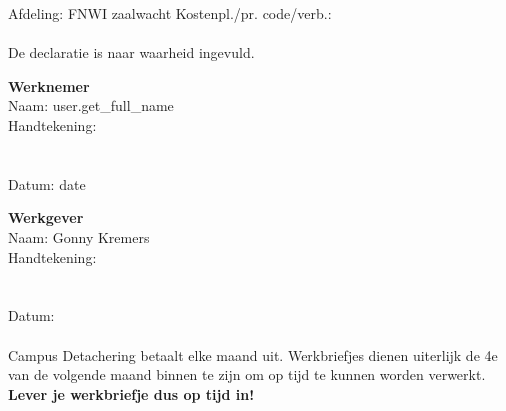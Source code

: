 \documentclass[a4paper,twoside]{article}
\begin{document}
			Afdeling: FNWI zaalwacht Kostenpl./pr. code/verb.:

		\paragraph{}

			De declaratie is naar waarheid ingevuld.

			\begin{multicols}{2}
				\textbf{Werknemer}
				\\
				Naam: {{ user.get_full_name }}
				\\
				Handtekening:
				\\
				\\
				\\
				Datum: {{ date }}

			\columnbreak
				\textbf{Werkgever}
				\\
				Naam: Gonny Kremers
				\\
				Handtekening:
				\\
				\\
				\\
				Datum:

			\end{multicols}

		\paragraph{}

			Campus Detachering betaalt elke maand uit. Werkbriefjes dienen uiterlijk de 4e van de volgende maand binnen te zijn om op tijd te kunnen worden verwerkt. {\bfseries Lever je werkbriefje dus op tijd in!}
\end{document}
